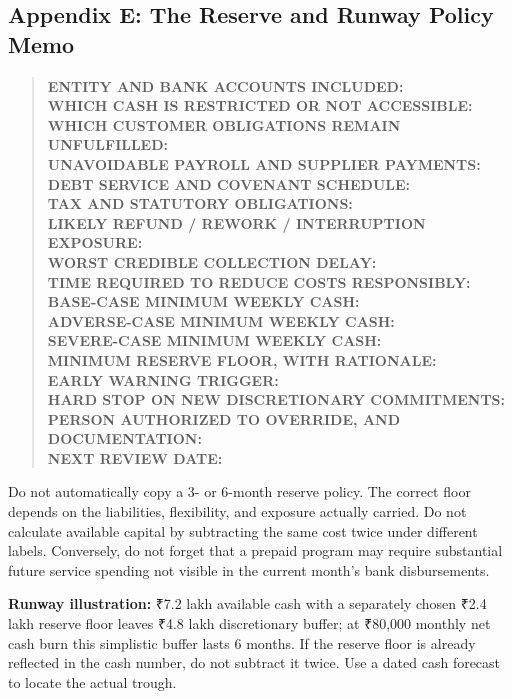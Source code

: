 \subsection*{Appendix E: The Reserve and Runway Policy Memo}

\begin{quote}
\small
\textbf{ENTITY AND BANK ACCOUNTS INCLUDED:}\\
\textbf{WHICH CASH IS RESTRICTED OR NOT ACCESSIBLE:}\\
\textbf{WHICH CUSTOMER OBLIGATIONS REMAIN UNFULFILLED:}\\
\textbf{UNAVOIDABLE PAYROLL AND SUPPLIER PAYMENTS:}\\
\textbf{DEBT SERVICE AND COVENANT SCHEDULE:}\\
\textbf{TAX AND STATUTORY OBLIGATIONS:}\\
\textbf{LIKELY REFUND / REWORK / INTERRUPTION EXPOSURE:}\\
\textbf{WORST CREDIBLE COLLECTION DELAY:}\\
\textbf{TIME REQUIRED TO REDUCE COSTS RESPONSIBLY:}\\
\textbf{BASE-CASE MINIMUM WEEKLY CASH:}\\
\textbf{ADVERSE-CASE MINIMUM WEEKLY CASH:}\\
\textbf{SEVERE-CASE MINIMUM WEEKLY CASH:}\\
\textbf{MINIMUM RESERVE FLOOR, WITH RATIONALE:}\\
\textbf{EARLY WARNING TRIGGER:}\\
\textbf{HARD STOP ON NEW DISCRETIONARY COMMITMENTS:}\\
\textbf{PERSON AUTHORIZED TO OVERRIDE, AND DOCUMENTATION:}\\
\textbf{NEXT REVIEW DATE:}
\end{quote}

Do not automatically copy a 3- or 6-month reserve policy. The correct floor depends on the liabilities, flexibility, and exposure actually carried. Do not calculate available capital by subtracting the same cost twice under different labels. Conversely, do not forget that a prepaid program may require substantial future service spending not visible in the current month's bank disbursements.

\textbf{Runway illustration:} ₹7.2 lakh available cash with a separately chosen ₹2.4 lakh reserve floor leaves ₹4.8 lakh discretionary buffer; at ₹80,000 monthly net cash burn this simplistic buffer lasts 6 months. If the reserve floor is already reflected in the cash number, do not subtract it twice. Use a dated cash forecast to locate the actual trough.

